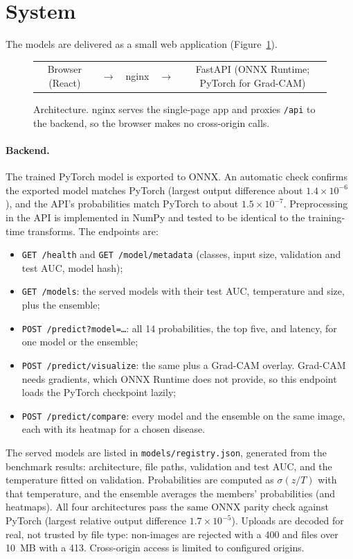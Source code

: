 \documentclass[11pt,a4paper]{article}
\begin{document}


\section{System}
The models are delivered as a small web application (Figure~\ref{fig:arch}).

\begin{figure}[htbp]
\centering
\small
\begin{tabular}{@{}c@{\ \ }c@{\ \ }c@{\ \ }c@{\ \ }c@{}}
Browser (React) & $\rightarrow$ & nginx & $\rightarrow$ & FastAPI (ONNX Runtime; PyTorch for Grad-CAM)
\end{tabular}
\caption{Architecture. nginx serves the single-page app and proxies \texttt{/api} to the backend, so the browser makes no cross-origin calls.}
\label{fig:arch}
\end{figure}

\paragraph{Backend.} The trained PyTorch model is exported to ONNX. An automatic check confirms the exported model matches PyTorch (largest output difference about $1.4\times10^{-6}$), and the API's probabilities match PyTorch to about $1.5\times10^{-7}$. Preprocessing in the API is implemented in NumPy and tested to be identical to the training-time transforms. The endpoints are:
\begin{itemize}
  \item \texttt{GET /health} and \texttt{GET /model/metadata} (classes, input size, validation and test AUC, model hash);
  \item \texttt{GET /models}: the served models with their test AUC, temperature and size, plus the ensemble;
  \item \texttt{POST /predict?model=\dots}: all 14 probabilities, the top five, and latency, for one model or the ensemble;
  \item \texttt{POST /predict/visualize}: the same plus a Grad-CAM overlay. Grad-CAM needs gradients, which ONNX Runtime does not provide, so this endpoint loads the PyTorch checkpoint lazily;
  \item \texttt{POST /predict/compare}: every model and the ensemble on the same image, each with its heatmap for a chosen disease.
\end{itemize}
The served models are listed in \texttt{models/registry.json}, generated from the benchmark results: architecture, file paths, validation and test AUC, and the temperature fitted on validation. Probabilities are computed as $\sigma(z/T)$ with that temperature, and the ensemble averages the members' probabilities (and heatmaps). All four architectures pass the same ONNX parity check against PyTorch (largest relative output difference $1.7\times10^{-5}$).
Uploads are decoded for real, not trusted by file type: non-images are rejected with a 400 and files over 10~MB with a 413. Cross-origin access is limited to configured origins.
\end{document}
